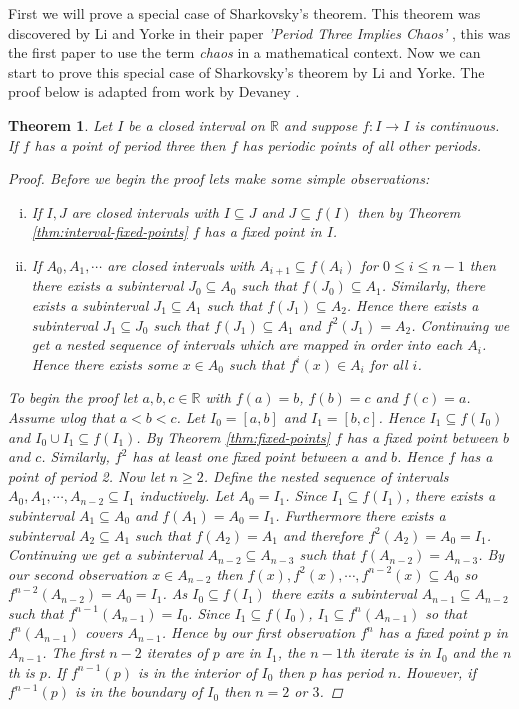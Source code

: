 \documentclass[11pt,a4paper,oneside]{memoir}
\theoremstyle{plain}
\newtheorem{thm}{Theorem}[chapter]
\theoremstyle{definition}
\begin{document}
First we will prove a special case of Sharkovsky's theorem. This theorem was discovered by Li and Yorke in their paper \emph{'Period Three Implies Chaos'} \cite{li-yorke}, this was the first paper to use the term \emph{chaos} in a mathematical context. Now we can start to prove this special case of Sharkovsky's theorem by Li and Yorke. The proof below is adapted from work by Devaney \cite[Chapter 1.10]{devaney}.

\begin{thm}\label{thm:period3chaos}
    Let $I$ be a closed interval on $\mathbb{R}$ and suppose $f: I \to I$ is continuous. If $f$ has a point of period three then $f$ has periodic points of all other periods.
    \begin{proof}
        Before we begin the proof lets make some simple observations:
        \begin{enumerate}[(i)]
            \item If $I, J$ are closed intervals with $I \subseteq J$ and $J \subseteq f(I)$ then by Theorem \ref{thm:interval-fixed-points} $f$ has a fixed point in $I$.
            \item If $A_0, A_1, \cdots$ are closed intervals with $A_{i+1} \subseteq f(A_i)$ for $0 \leq i \leq n - 1$ then there exists a subinterval $J_0 \subseteq A_0$ such that $f(J_0) \subseteq A_1$. Similarly, there exists a subinterval $J_1 \subseteq A_1$ such that $f(J_1) \subseteq A_2$. Hence there exists a subinterval $J_1 \subseteq J_0$ such that $f(J_1) \subseteq A_1$ and $f^2(J_1) = A_2$. Continuing we get a nested sequence of intervals which are mapped in order into each $A_i$. Hence there exists some $x \in A_0$ such that $f^i(x) \in A_i$ for all $i$.
        \end{enumerate}
        To begin the proof let $a, b, c \in \mathbb{R}$ with $f(a) = b$, $f(b) = c$ and $f(c) = a$. Assume wlog that $a < b < c$. Let $I_0 = [a,b]$ and $I_1 = [b,c]$. Hence $I_1 \subseteq f(I_0)$ and $I_0 \cup I_1 \subseteq f(I_1)$. By Theorem \ref{thm:fixed-points} $f$ has a fixed point between $b$ and $c$. Similarly, $f^2$ has at least one fixed point between $a$ and $b$. Hence $f$ has a point of period 2. Now let $n \geq 2$. Define the nested sequence of intervals $A_0, A_1, \cdots, A_{n-2} \subseteq I_1$ inductively. Let $A_0 = I_1$. Since $I_1 \subseteq f(I_1)$, there exists a subinterval $A_1 \subseteq A_0$ and $f(A_1) = A_0 = I_1$. Furthermore there exists a subinterval $A_2 \subseteq A_1$ such that $f(A_2) = A_1$ and therefore $f^2(A_2) = A_0 = I_1$. Continuing we get a subinterval $A_{n-2} \subseteq A_{n-3}$ such that $f(A_{n-2}) = A_{n-3}$. By our second observation $x \in A_{n-2}$ then $f(x), f^2(x), \cdots, f^{n-2}(x) \subseteq A_0$ so $f^{n-2}(A_{n-2}) = A_0 = I_1$. As $I_0 \subseteq f(I_1)$ there exits a subinterval $A_{n-1} \subseteq A_{n-2}$ such that $f^{n-1}(A_{n-1}) = I_0$. Since $I_1 \subseteq f(I_0)$, $I_1 \subseteq f^n(A_{n-1})$ so that $f^n(A_{n-1})$ covers $A_{n-1}$. Hence by our first observation $f^n$ has a fixed point $p$ in $A_{n-1}$. The first $n-2$ iterates of $p$ are in $I_1$, the $n-1$th iterate is in $I_0$ and the $n$th is $p$. If $f^{n-1}(p)$ is in the interior of $I_0$ then $p$ has period $n$. However, if $f^{n-1}(p)$ is in the boundary of $I_0$ then $n = 2$ or $3$.

\end{proof}
\end{thm}
\end{document}
